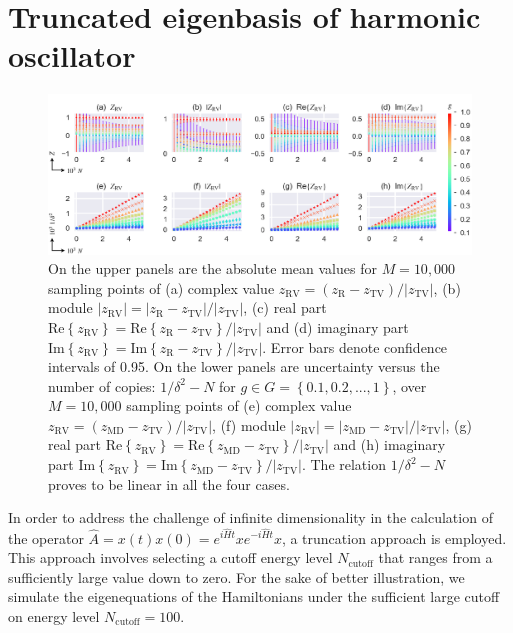 \documentclass[twocolumn,pra,aps,superscriptaddress]{revtex4-2}
\begin{document}
\section{Truncated eigenbasis of harmonic oscillator}\label{TEHO}

\begin{figure}
\includegraphics[width=17.2cm]{Fig6}
\caption{\label{figS2} On the upper panels are the absolute mean values for $M=10,000$ sampling points of (a) complex value $z_{\text{RV}}=\left(z_{\text{R}}-z_{\text{TV}} \right) / |z_{\text{TV}}|$, (b) module $|z_{\text{RV}}| =|z_{\text{R}}-z_{\text{TV}}| / |z_{\text{TV}}|$, (c) real part $\text{Re}\left\{z_{\text{RV}}\right\} =\text{Re}\left\{z_{\text{R}}-z_{\text{TV}}\right\} / |z_{\text{TV}}|$ and (d) imaginary part $\text{Im}\left\{z_{\text{RV}}\right\} =\text{Im}\left\{z_{\text{R}}-z_{\text{TV}}\right\} / |z_{\text{TV}}|$. Error bars denote confidence intervals of 0.95. On the lower panels are uncertainty versus the number of copies: $1/\delta^2-N$ for $g\in G=\left\{0.1, 0.2, ..., 1\right\}$, over $M=10,000$ sampling points of (e) complex value $z_{\text{RV}} =\left(z_{\text{MD}}-z_{\text{TV}} \right) / |z_{\text{TV}}|$, (f) module $|z_{\text{RV}}| =|z_{\text{MD}}-z_{\text{TV}}| / |z_{\text{TV}}|$, (g) real part $\text{Re}\left\{z_{\text{RV}}\right\} =\text{Re}\left\{z_{\text{MD}}-z_{\text{TV}}\right\} / |z_{\text{TV}}|$ and (h) imaginary part $\text{Im}\left\{z_{\text{RV}}\right\} =\text{Im}\left\{z_{\text{MD}}-z_{\text{TV}}\right\} / |z_{\text{TV}}|$. The relation $1/\delta^2-N$  proves to be linear in all the four cases.}
\end{figure}

In order to address the challenge of infinite dimensionality in the calculation of the operator $\hat{A}=x(t)x(0)=e^{i\hat{H}t}xe^{-i\hat{H}t}x$, a truncation approach is employed. This approach involves selecting a cutoff energy level $N_{\text{cutoff}}$ that ranges from a sufficiently large value down to zero. For the sake of better illustration, we simulate the eigenequations of the Hamiltonians under the sufficient large cutoff on energy level $N_{\text{cutoff}}=100$.
\end{document}
